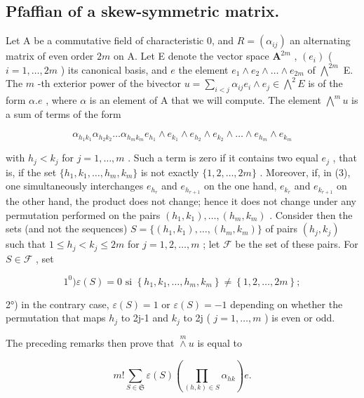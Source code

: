 \subsection{Pfaffian of a skew-symmetric matrix.}

Let A be a commutative field of characteristic 0, and \(R = (\alpha_{ij})\) an alternating matrix of even order \(2m\) on A. Let E denote the vector space \(\mathbf{A}^{2m}\) , \((e_i)\) ( \(i = 1, \ldots, 2m\) ) its canonical basis, and \(e\) the element \(e_1 \wedge e_2 \wedge \ldots \wedge e_{2m}\) of \(\bigwedge^{2m}\) E. The \(m\) -th exterior power of the bivector \(u = \sum_{i < j} \alpha_{ij} e_i \wedge e_j \in \bigwedge^2 E\) is of the form \(\alpha.e\) , where \(\alpha\) is an element of A that we will compute. The element \(\bigwedge^m u\) is a sum of terms of the form

\[
\alpha_ {h _ {1} k _ {1}} \alpha_ {h _ {2} k _ {2}} \dots \alpha_ {h _ {m} k _ {m}} e _ {h _ {1}} \wedge e _ {k _ {1}} \wedge e _ {h _ {2}} \wedge e _ {k _ {2}} \wedge \dots \wedge e _ {h _ {m}} \wedge e _ {k _ {m}}\tag{3}
\]

with \(h_j < k_j\) for \(j = 1, \ldots, m\) . Such a term is zero if it contains two equal \(e_j\) , that is, if the set \(\{h_1, k_1, \ldots, h_m, k_m\}\) is not exactly \(\{1, 2, \ldots, 2m\}\) . Moreover, if, in (3), one simultaneously interchanges \(e_{h_r}\) and \(e_{h_{r+1}}\) on the one hand, \(e_{k_r}\) and \(e_{k_{r+1}}\) on the other hand, the product does not change; hence it does not change under any permutation performed on the pairs \((h_1, k_1), \ldots, (h_m, k_m)\) . Consider then the sets (and not the sequences) \(S = \{(h_1, k_1), \ldots, (h_m, k_m)\}\) of pairs \((h_j, k_j)\) such that \(1 \leqslant h_j < k_j \leqslant 2m\) for \(j = 1, 2, \ldots, m\) ; let \(\mathscr{F}\) be the set of these pairs. For \(S \in \mathscr{F}\) , set

\[
1 ^ {0}) \varepsilon (S) = 0 \text {   si   } \left\{h _ {1}, k _ {1}, \dots , h _ {m}, k _ {m} \right\} \neq \left\{1, 2, \dots , 2 m \right\};
\]

2°) in the contrary case, \(\varepsilon(S)=1\) or \(\varepsilon(S)=-1\) depending on whether the permutation that maps \(h_{j}\) to 2j-1 and \(k_{j}\) to 2j ( \(j=1,\ldots,m\) ) is even or odd.

The preceding remarks then prove that \(\overset{m}{\wedge} u\) is equal to

\[
m! \sum_ {S \in \mathfrak {S}} \varepsilon (S) (\prod_ {(h, k) \in S} \alpha_ {h k}) e.\tag{4}
\]

